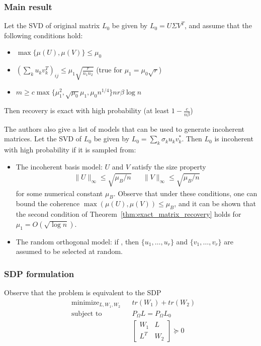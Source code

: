 \documentclass{../../common/projectreport}
\begin{document}
\subsubsection{Main result}
\begin{theorem}
\label{thm:exact_matrix_recovery}
Let the SVD of original matrix $L_0$ be given by $L_0 = U \Sigma V^T$, and assume that the following conditions hold:
\begin{itemize}
\item $\max \{\mu(U), \mu(V)\} \leq \mu_0$
\item $\left( \sum_k u_kv_k^T\right)_{ij} \leq \mu_1 \sqrt{\frac{r}{n_1 n_2}}$ (true for $\mu_1 = \mu_0\sqrt{r}$)
\item $m \geq c \max \{ \mu_1^2, \sqrt{\mu_0}\mu_1, \mu_0 n^{1/4}\}n r \beta \log n$
\end{itemize}
Then recovery is exact with high probability (at least $1-\frac{c}{n\beta}$)
\end{theorem}


The authors also give a list of models that can be used to generate incoherent matrices. Let the SVD of $L_0$ be given by $L_0 = \sum_k \sigma_k u_k v_k^*$. Then $L_0$ is incoherent with high probability if it is sampled from:
\begin{itemize}
\item The incoherent basis model: $U$ and $V$ satisfy the size property
\[
\begin{aligned}
\|U\|_\infty \leq \sqrt{\mu_B/n} && \|V\|_\infty \leq \sqrt{\mu_B/n}
\end{aligned}
\]
for some numerical constant $\mu_B$. Observe that under these conditions, one can bound the coherence $\max (\mu(U), \mu(V)) \leq \mu_B$, and it can be shown that the second condition of Theorem~\ref{thm:exact_matrix_recovery} holds for $\mu_1 = O(\sqrt{\log n})$.

\item The random orthogonal model: if , then $\{u_1, \dots, u_r\}$ and $\{v_1, \dots, v_r\}$ are assumed to be selected at random.
\end{itemize}

\subsubsection{SDP formulation}

Observe that the problem is equivalent to the SDP
\begin{equation}
\begin{aligned}
&\text{minimize}_{L, W_1, W_2} && tr(W_1) + tr(W_2) \\
&\text{subject to} && P_\Omega L = P_\Omega L_0\\
&&& \left[ \begin{array}{cc}
W_1 & L \\
L^T & W_2
\end{array} \right] \succeq 0
\end{aligned}
\end{equation}
\end{document}
